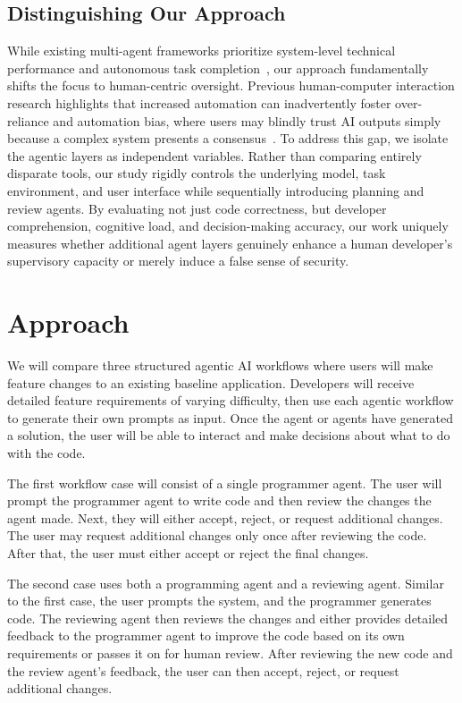 \documentclass{chi-ext}
\begin{document}
\subsection{Distinguishing Our Approach}
While existing multi-agent frameworks prioritize system-level technical performance and autonomous task completion~\cite{hong2024metagpt, qian2024chatdev, huang2023agentcoder}, our approach fundamentally shifts the focus to human-centric oversight. Previous human-computer interaction research highlights that increased automation can inadvertently foster over-reliance and automation bias, where users may blindly trust AI outputs simply because a complex system presents a consensus~\cite{bucinca2021trust, mozannar2022reading, vaithilingam2022expectation}. To address this gap, we isolate the agentic layers as independent variables. Rather than comparing entirely disparate tools, our study rigidly controls the underlying model, task environment, and user interface while sequentially introducing planning and review agents. By evaluating not just code correctness, but developer comprehension, cognitive load, and decision-making accuracy, our work uniquely measures whether additional agent layers genuinely enhance a human developer's supervisory capacity or merely induce a false sense of security.

\section{Approach}
We will compare three structured agentic AI workflows where users will make feature changes to an existing baseline application. Developers will receive detailed feature requirements of varying difficulty, then use each agentic workflow to generate their own prompts as input. Once the agent or agents have generated a solution, the user will be able to interact and make decisions about what to do with the code. 

The first workflow case will consist of a single programmer agent. The user will prompt the programmer agent to write code and then review the changes the agent made. Next, they will either accept, reject, or request additional changes. The user may request additional changes only once after reviewing the code. After that, the user must either accept or reject the final changes. 

The second case uses both a programming agent and a reviewing agent. Similar to the first case, the user prompts the system, and the programmer generates code. The reviewing agent then reviews the changes and either provides detailed feedback to the programmer agent to improve the code based on its own requirements or passes it on for human review. After reviewing the new code and the review agent's feedback, the user can then accept, reject, or request additional changes. 
\end{document}
